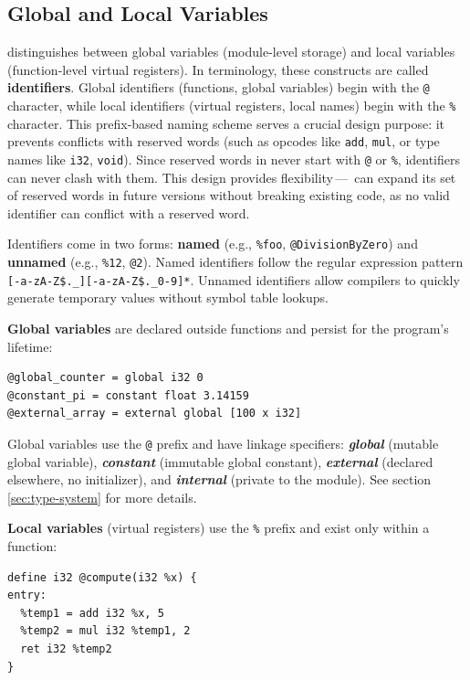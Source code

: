 \subsection{Global and Local Variables}

 distinguishes between global variables (module-level storage) and local variables (function-level virtual registers). In  terminology, these constructs are called \textbf{identifiers}. Global identifiers (functions, global variables) begin with the \texttt{@} character, while local identifiers (virtual registers, local names) begin with the \texttt{\%} character. This prefix-based naming scheme serves a crucial design purpose: it prevents conflicts with reserved words (such as opcodes like \texttt{add}, \texttt{mul}, or type names like \texttt{i32}, \texttt{void}). Since reserved words in  never start with \texttt{@} or \texttt{\%}, identifiers can never clash with them. This design provides flexibility\,---\, can expand its set of reserved words in future versions without breaking existing code, as no valid identifier can conflict with a reserved word.

Identifiers come in two forms: \textbf{named} (e.g., \texttt{\%foo}, \texttt{@DivisionByZero}) and \textbf{unnamed} (e.g., \texttt{\%12}, \texttt{@2}). Named identifiers follow the regular expression pattern \texttt{[-a-zA-Z\$.\allowbreak\_][-a-zA-Z\$.\allowbreak\_0-9]*}. Unnamed identifiers allow compilers to quickly generate temporary values without symbol table lookups.

\textbf{Global variables} are declared outside functions and persist for the program's lifetime:

\begin{lstlisting}[style=ir]
@global_counter = global i32 0
@constant_pi = constant float 3.14159
@external_array = external global [100 x i32]
\end{lstlisting}

Global variables use the \texttt{@} prefix and have linkage specifiers: \textbf{\textit{global}} (mutable global variable), \textbf{\textit{constant}} (immutable global constant), \textbf{\textit{external}} (declared elsewhere, no initializer), and \textbf{\textit{internal}} (private to the module). See section \ref{sec:type-system} for more details.

\textbf{Local variables} (virtual registers) use the \texttt{\%} prefix and exist only within a function:

\begin{lstlisting}[style=ir]
define i32 @compute(i32 %x) {
entry:
  %temp1 = add i32 %x, 5
  %temp2 = mul i32 %temp1, 2
  ret i32 %temp2
}
\end{lstlisting}

